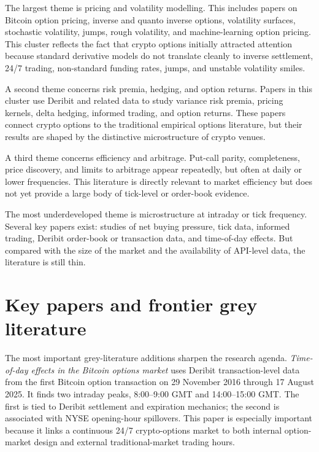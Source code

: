 \documentclass[11pt,a4paper]{article}
\begin{document}
The largest theme is pricing and volatility modelling. This includes papers on Bitcoin option pricing, inverse and quanto inverse options, volatility surfaces, stochastic volatility, jumps, rough volatility, and machine-learning option pricing. This cluster reflects the fact that crypto options initially attracted attention because standard derivative models do not translate cleanly to inverse settlement, 24/7 trading, non-standard funding rates, jumps, and unstable volatility smiles.

A second theme concerns risk premia, hedging, and option returns. Papers in this cluster use Deribit and related data to study variance risk premia, pricing kernels, delta hedging, informed trading, and option returns. These papers connect crypto options to the traditional empirical options literature, but their results are shaped by the distinctive microstructure of crypto venues.

A third theme concerns efficiency and arbitrage. Put-call parity, completeness, price discovery, and limits to arbitrage appear repeatedly, but often at daily or lower frequencies. This literature is directly relevant to market efficiency but does not yet provide a large body of tick-level or order-book evidence.

The most underdeveloped theme is microstructure at intraday or tick frequency. Several key papers exist: studies of net buying pressure, tick data, informed trading, Deribit order-book or transaction data, and time-of-day effects. But compared with the size of the market and the availability of API-level data, the literature is still thin.

\section{Key papers and frontier grey literature}

The most important grey-literature additions sharpen the research agenda. \emph{Time-of-day effects in the Bitcoin options market} uses Deribit transaction-level data from the first Bitcoin option transaction on 29 November 2016 through 17 August 2025. It finds two intraday peaks, 8:00--9:00 GMT and 14:00--15:00 GMT. The first is tied to Deribit settlement and expiration mechanics; the second is associated with NYSE opening-hour spillovers. This paper is especially important because it links a continuous 24/7 crypto-options market to both internal option-market design and external traditional-market trading hours.
\end{document}
